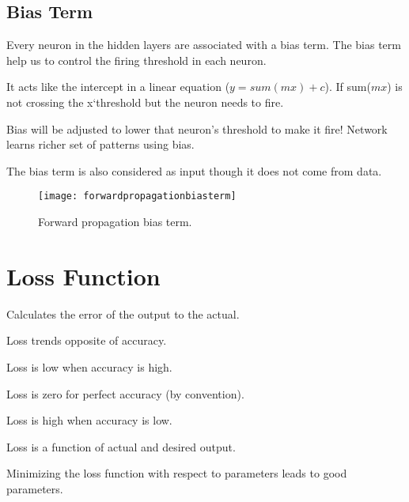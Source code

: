 	\subsection{Bias Term}
	\begin{bulletedlist}
		\item Every neuron in the hidden layers are associated with a bias term. The bias term help us to control the firing threshold in each neuron.
		\item It acts like the intercept in a linear equation ($y = sum(mx) + c$). If sum($mx$) is not crossing the x`threshold but the neuron needs to fire.
		\item Bias will be adjusted to lower that neuron's threshold to make it fire! Network learns richer set of patterns using bias.
		\item The bias term is also considered as input though it does not come from data.
	\end{bulletedlist}
 	\begin{figure}[htb]
		\centering
		\texttt{[image: forwardpropagationbiasterm]}
		\caption[Forward propagation bias term]{Forward propagation bias term.}
		\label{fig:forwardpropagationbiasterm}
	\end{figure}


	\section{Loss Function}
Calculates the error of the output to the actual.
	\begin{bulletedlist}
		\item Loss trends opposite of accuracy.
		\begin{bulletedlist}
			\item Loss is low when accuracy is high.
			\item Loss is zero for perfect accuracy (by convention).
			\item Loss is high when accuracy is low.
		\end{bulletedlist}
		\item Loss is a function of actual and desired output.
		\item Minimizing the loss function with respect to parameters leads to good parameters.
	\end{bulletedlist}


